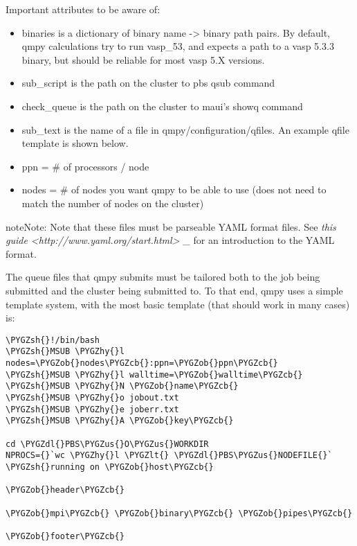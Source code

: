 \documentclass[letterpaper,10pt,english]{sphinxmanual}
\def\PYGZus{\char`\_}
\def\PYGZob{\char`\{}
\def\PYGZcb{\char`\}}
\def\PYGZlt{\char`\<}
\def\PYGZsh{\char`\#}
\def\PYGZdl{\char`\$}
\def\PYGZhy{\char`\-}
\begin{document}
Important attributes to be aware of:
\begin{itemize}
\item {} 
binaries is a dictionary of binary name -\textgreater{} binary path pairs. By default,
qmpy calculations try to run vasp\_53, and expects a path to a vasp 5.3.3
binary, but should be reliable for most vasp 5.X versions.

\item {} 
sub\_script is the path on the cluster to pbs qsub command

\item {} 
check\_queue is the path on the cluster to maui's showq command

\item {} 
sub\_text is the name of a file in qmpy/configuration/qfiles. An example qfile
template is shown below.

\item {} 
ppn = \# of processors / node

\item {} 
nodes = \# of nodes you want qmpy to be able to use (does not need to match
the number of nodes on the cluster)

\end{itemize}

\begin{notice}{note}{Note:}
Note that these files must be parseable YAML format files. See \emph{this guide
\textless{}http://www.yaml.org/start.html\textgreater{} \_} for an introduction to the YAML format.
\end{notice}

The queue files that qmpy submits must be tailored both to the job being
submitted and the cluster being submitted to. To that end, qmpy uses a simple
template system, with the most basic template (that should work in many cases)
is:

\begin{Verbatim}[commandchars=\\\{\}]
\PYGZsh{}!/bin/bash
\PYGZsh{}MSUB \PYGZhy{}l nodes=\PYGZob{}nodes\PYGZcb{}:ppn=\PYGZob{}ppn\PYGZcb{}
\PYGZsh{}MSUB \PYGZhy{}l walltime=\PYGZob{}walltime\PYGZcb{}
\PYGZsh{}MSUB \PYGZhy{}N \PYGZob{}name\PYGZcb{}
\PYGZsh{}MSUB \PYGZhy{}o jobout.txt
\PYGZsh{}MSUB \PYGZhy{}e joberr.txt
\PYGZsh{}MSUB \PYGZhy{}A \PYGZob{}key\PYGZcb{}

cd \PYGZdl{}PBS\PYGZus{}O\PYGZus{}WORKDIR
NPROCS={}`wc \PYGZhy{}l \PYGZlt{} \PYGZdl{}PBS\PYGZus{}NODEFILE{}`
\PYGZsh{}running on \PYGZob{}host\PYGZcb{}

\PYGZob{}header\PYGZcb{}

\PYGZob{}mpi\PYGZcb{} \PYGZob{}binary\PYGZcb{} \PYGZob{}pipes\PYGZcb{}

\PYGZob{}footer\PYGZcb{}
\end{Verbatim}
\end{document}
